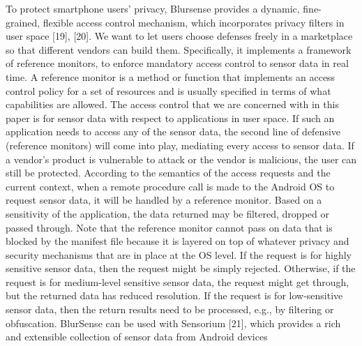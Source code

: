 To protect smartphone users'
privacy, Blursense provides a dynamic, fine-
grained, flexible access control mechanism, which incorporates
privacy filters in user space [19], [20]. We want to let users
choose defenses freely in a marketplace so that different
vendors can build them.
Specifically, it implements a framework of reference
monitors, to enforce mandatory access control to sensor data
in real time. A reference monitor is a method or function that
implements an access control policy for a set of resources and
is usually specified in terms of what capabilities are allowed.
The access control that we are concerned with in this paper is
for sensor data with respect to applications in user space. If
such an application needs to access any of the sensor data, the
second line of defensive (reference monitors) will come into
play, mediating every access to sensor data. 
If a vendor's product is vulnerable to attack or the vendor is malicious,
the user can still be protected.
According to the semantics of the access requests and the
current context, when a remote procedure call is made to the
Android OS to request sensor data, it will be handled by a
reference monitor. Based on a sensitivity of the application,
the data returned may be filtered, dropped or passed through.
Note that the reference monitor cannot pass on data that is
blocked by the manifest file because it is layered on top of
whatever privacy and security mechanisms that are in place at
the OS level. If the request is for highly sensitive sensor data,
then the request might be simply rejected. Otherwise, if the
request is for medium-level sensitive sensor data, the request
might get through, but the returned data has reduced resolution.
If the request is for low-sensitive sensor data, then the return
results need to be processed, e.g., by filtering or obfuscation.
BlurSense can be used with Sensorium [21], 
which provides
a rich and extensible collection of sensor data from Android
devices 

